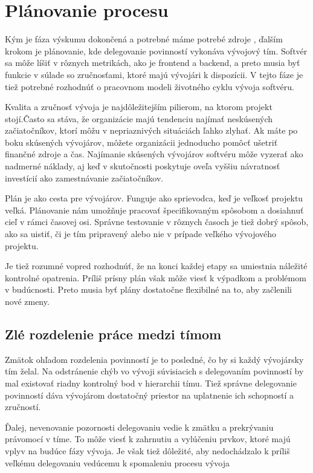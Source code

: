 \documentclass[10pt,twoside,slovak,a4paper]{article}
\begin{document}
\section{Plánovanie procesu}
Kým je fáza výskumu dokončená a potrebné máme potrebé zdroje , ďalším krokom je plánovanie, kde delegovanie povinností vykonáva vývojový tím. Softvér sa môže líšiť v rôznych metrikách, ako je frontend a backend, a preto musia byť funkcie v súlade so zručnosťami, ktoré majú vývojári k dispozícii. V tejto fáze je tiež potrebné rozhodnúť o pracovnom modeli životného cyklu vývoja softvéru.

Kvalita a zručnosť vývoja je najdôležitejším pilierom, na ktorom projekt stojí.Často sa stáva, že organizácie majú tendenciu najímať neskúsených začiatočníkov, ktorí môžu v nepriaznivých situáciách ľahko zlyhať.
Ak máte po boku skúsených vývojárov, môžete organizácii jednoducho pomôcť ušetriť finančné zdroje a čas. Najímanie skúsených vývojárov softvéru môže vyzerať ako nadmerné náklady, aj keď v skutočnosti poskytuje oveľa vyššiu návratnosť investícií ako zamestnávanie začiatočníkov.

Plán je ako cesta pre vývojárov. Funguje ako sprievodca, keď je veľkosť projektu veľká. Plánovanie nám umožňuje pracovať špecifikovaným spôsobom a dosiahnuť cieľ v rámci časovej osi. Správne testovanie v rôznych časoch je tiež dobrý spôsob, ako sa uistiť, či je tím pripravený alebo nie v prípade veľkého vývojového projektu.

Je tiež rozumné vopred rozhodnúť, že na konci každej etapy sa umiestnia náležité kontrolné opatrenia. Príliš prísny plán však môže viesť k výpadkom a problémom v budúcnosti. Preto musia byť plány dostatočne flexibilné na to, aby začlenili nové zmeny.

\subsection{Zlé rozdelenie práce medzi tímom}

Zmätok ohľadom rozdelenia povinností je to posledné, čo by si každý vývojársky tím želal. Na odstránenie chýb vo vývoji súvisiacich s delegovaním povinností by mal existovať riadny kontrolný bod v hierarchii tímu. Tiež správne delegovanie povinností dáva vývojárom dostatočný priestor na uplatnenie ich schopností a zručností.

Ďalej, nevenovanie pozornosti delegovaniu vedie k zmätku a prekrývaniu právomocí v tíme. To môže viesť k zahrnutiu a vylúčeniu prvkov, ktoré majú vplyv na budúce fázy vývoja. Je však tiež dôležité, aby nedochádzalo k príliš veľkému delegovaniu vedúcemu k spomaleniu procesu vývoja
\end{document}
